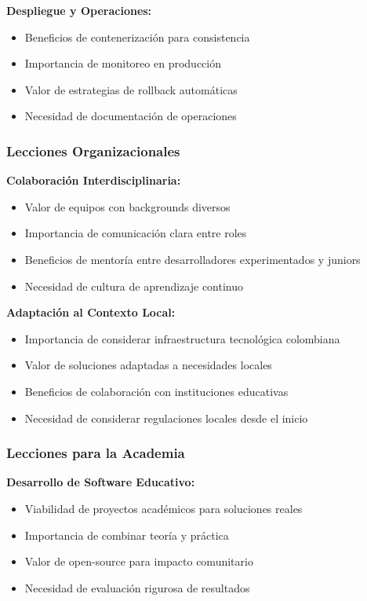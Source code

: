 \textbf{Despliegue y Operaciones:}
\begin{itemize}
\item Beneficios de contenerización para consistencia
\item Importancia de monitoreo en producción
\item Valor de estrategias de rollback automáticas
\item Necesidad de documentación de operaciones
\end{itemize}

\subsubsection{Lecciones Organizacionales}

\textbf{Colaboración Interdisciplinaria:}
\begin{itemize}
\item Valor de equipos con backgrounds diversos
\item Importancia de comunicación clara entre roles
\item Beneficios de mentoría entre desarrolladores experimentados y juniors
\item Necesidad de cultura de aprendizaje continuo
\end{itemize}

\textbf{Adaptación al Contexto Local:}
\begin{itemize}
\item Importancia de considerar infraestructura tecnológica colombiana
\item Valor de soluciones adaptadas a necesidades locales
\item Beneficios de colaboración con instituciones educativas
\item Necesidad de considerar regulaciones locales desde el inicio
\end{itemize}

\subsubsection{Lecciones para la Academia}

\textbf{Desarrollo de Software Educativo:}
\begin{itemize}
\item Viabilidad de proyectos académicos para soluciones reales
\item Importancia de combinar teoría y práctica
\item Valor de open-source para impacto comunitario
\item Necesidad de evaluación rigurosa de resultados
\end{itemize}

